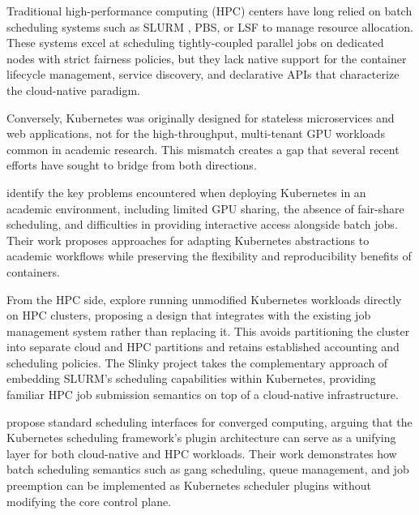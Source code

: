 Traditional high-performance computing (HPC) centers have long relied on batch scheduling systems such as SLURM \citep{yoo2003slurm}, PBS, or LSF to manage resource allocation. These systems excel at scheduling tightly-coupled parallel jobs on dedicated nodes with strict fairness policies, but they lack native support for the container lifecycle management, service discovery, and declarative APIs that characterize the cloud-native paradigm.

Conversely, Kubernetes was originally designed for stateless microservices and web applications, not for the high-throughput, multi-tenant GPU workloads common in academic research. This mismatch creates a gap that several recent efforts have sought to bridge from both directions.

\citet{spisakova2023kubernetes} identify the key problems encountered when deploying Kubernetes in an academic environment, including limited GPU sharing, the absence of fair-share scheduling, and difficulties in providing interactive access alongside batch jobs. Their work proposes approaches for adapting Kubernetes abstractions to academic workflows while preserving the flexibility and reproducibility benefits of containers.

From the HPC side, \citet{chazapis2023kubernetes} explore running unmodified Kubernetes workloads directly on HPC clusters, proposing a design that integrates with the existing job management system rather than replacing it. This avoids partitioning the cluster into separate cloud and HPC partitions and retains established accounting and scheduling policies. The Slinky project \citep{wickberg2025slinky} takes the complementary approach of embedding SLURM's scheduling capabilities within Kubernetes, providing familiar HPC job submission semantics on top of a cloud-native infrastructure.

\citet{misale2022standard} propose standard scheduling interfaces for converged computing, arguing that the Kubernetes scheduling framework's plugin architecture can serve as a unifying layer for both cloud-native and HPC workloads. Their work demonstrates how batch scheduling semantics such as gang scheduling, queue management, and job preemption can be implemented as Kubernetes scheduler plugins without modifying the core control plane.


